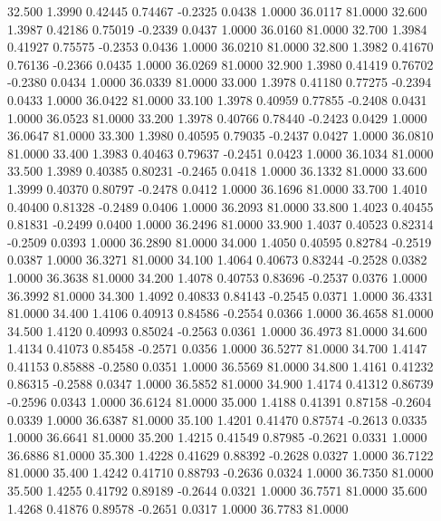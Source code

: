   32.500   1.3990   0.42445   0.74467  -0.2325   0.0438   1.0000  36.0117  81.0000
  32.600   1.3987   0.42186   0.75019  -0.2339   0.0437   1.0000  36.0160  81.0000
  32.700   1.3984   0.41927   0.75575  -0.2353   0.0436   1.0000  36.0210  81.0000
  32.800   1.3982   0.41670   0.76136  -0.2366   0.0435   1.0000  36.0269  81.0000
  32.900   1.3980   0.41419   0.76702  -0.2380   0.0434   1.0000  36.0339  81.0000
  33.000   1.3978   0.41180   0.77275  -0.2394   0.0433   1.0000  36.0422  81.0000
  33.100   1.3978   0.40959   0.77855  -0.2408   0.0431   1.0000  36.0523  81.0000
  33.200   1.3978   0.40766   0.78440  -0.2423   0.0429   1.0000  36.0647  81.0000
  33.300   1.3980   0.40595   0.79035  -0.2437   0.0427   1.0000  36.0810  81.0000
  33.400   1.3983   0.40463   0.79637  -0.2451   0.0423   1.0000  36.1034  81.0000
  33.500   1.3989   0.40385   0.80231  -0.2465   0.0418   1.0000  36.1332  81.0000
  33.600   1.3999   0.40370   0.80797  -0.2478   0.0412   1.0000  36.1696  81.0000
  33.700   1.4010   0.40400   0.81328  -0.2489   0.0406   1.0000  36.2093  81.0000
  33.800   1.4023   0.40455   0.81831  -0.2499   0.0400   1.0000  36.2496  81.0000
  33.900   1.4037   0.40523   0.82314  -0.2509   0.0393   1.0000  36.2890  81.0000
  34.000   1.4050   0.40595   0.82784  -0.2519   0.0387   1.0000  36.3271  81.0000
  34.100   1.4064   0.40673   0.83244  -0.2528   0.0382   1.0000  36.3638  81.0000
  34.200   1.4078   0.40753   0.83696  -0.2537   0.0376   1.0000  36.3992  81.0000
  34.300   1.4092   0.40833   0.84143  -0.2545   0.0371   1.0000  36.4331  81.0000
  34.400   1.4106   0.40913   0.84586  -0.2554   0.0366   1.0000  36.4658  81.0000
  34.500   1.4120   0.40993   0.85024  -0.2563   0.0361   1.0000  36.4973  81.0000
  34.600   1.4134   0.41073   0.85458  -0.2571   0.0356   1.0000  36.5277  81.0000
  34.700   1.4147   0.41153   0.85888  -0.2580   0.0351   1.0000  36.5569  81.0000
  34.800   1.4161   0.41232   0.86315  -0.2588   0.0347   1.0000  36.5852  81.0000
  34.900   1.4174   0.41312   0.86739  -0.2596   0.0343   1.0000  36.6124  81.0000
  35.000   1.4188   0.41391   0.87158  -0.2604   0.0339   1.0000  36.6387  81.0000
  35.100   1.4201   0.41470   0.87574  -0.2613   0.0335   1.0000  36.6641  81.0000
  35.200   1.4215   0.41549   0.87985  -0.2621   0.0331   1.0000  36.6886  81.0000
  35.300   1.4228   0.41629   0.88392  -0.2628   0.0327   1.0000  36.7122  81.0000
  35.400   1.4242   0.41710   0.88793  -0.2636   0.0324   1.0000  36.7350  81.0000
  35.500   1.4255   0.41792   0.89189  -0.2644   0.0321   1.0000  36.7571  81.0000
  35.600   1.4268   0.41876   0.89578  -0.2651   0.0317   1.0000  36.7783  81.0000
